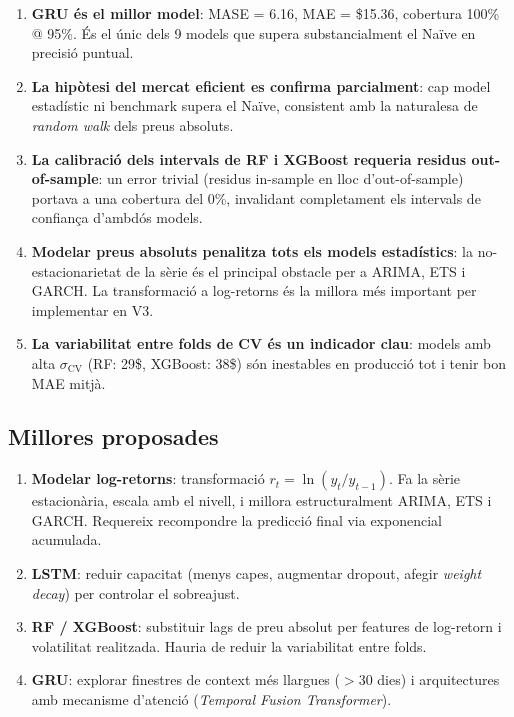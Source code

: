 \documentclass[12pt,a4paper]{article}
\begin{document}
\begin{enumerate}
  \item \textbf{GRU és el millor model}: MASE = 6.16, MAE = \$15.36, cobertura
        100\% @ 95\%. És el únic dels 9 models que supera substancialment el Naïve
        en precisió puntual.

  \item \textbf{La hipòtesi del mercat eficient es confirma parcialment}: cap
        model estadístic ni benchmark supera el Naïve, consistent amb la naturalesa
        de \textit{random walk} dels preus absoluts.

  \item \textbf{La calibració dels intervals de RF i XGBoost requeria residus out-of-sample}:
        un error trivial (residus in-sample en lloc d'out-of-sample) portava a una
        cobertura del 0\%, invalidant completament els intervals de confiança d'ambdós models.

  \item \textbf{Modelar preus absoluts penalitza tots els models estadístics}:
        la no-estacionarietat de la sèrie és el principal obstacle per a ARIMA, ETS i GARCH.
        La transformació a log-retorns és la millora més important per implementar en V3.

  \item \textbf{La variabilitat entre folds de CV és un indicador clau}: models
        amb alta $\sigma_{\text{CV}}$ (RF: 29\$, XGBoost: 38\$) són inestables en
        producció tot i tenir bon MAE mitjà.
\end{enumerate}

\subsection{Millores proposades}

\begin{enumerate}
  \item \textbf{Modelar log-retorns}: transformació $r_t = \ln(y_t/y_{t-1})$. Fa
        la sèrie estacionària, escala amb el nivell, i millora estructuralment ARIMA,
        ETS i GARCH. Requereix recompondre la predicció final via exponencial acumulada.
  \item \textbf{LSTM}: reduir capacitat (menys capes, augmentar dropout,
        afegir \textit{weight decay}) per controlar el sobreajust.
  \item \textbf{RF / XGBoost}: substituir lags de preu absolut per features de
        log-retorn i volatilitat realitzada. Hauria de reduir la variabilitat entre folds.
  \item \textbf{GRU}: explorar finestres de context més llargues ($>$30 dies) i
        arquitectures amb mecanisme d'atenció (\textit{Temporal Fusion Transformer}).
\end{enumerate}
\end{document}
